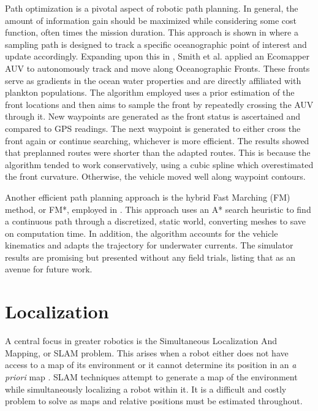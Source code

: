 \documentclass[double,12pt]{beavtex}
\begin{document}
Path optimization is a pivotal aspect of robotic path planning. In general, the amount of information gain should be maximized while considering some cost function, often times the mission duration. This approach is shown in \cite{smithtracking} where a sampling path is designed to track a specific oceanographic point of interest and update accordingly. Expanding upon this in \cite{smithfront}, Smith et al. applied an Ecomapper AUV to autonomously track and move along Oceanographic Fronts. These fronts serve as gradients in the ocean water properties and are directly affiliated with plankton populations. The algorithm employed uses a prior estimation of the front locations and then aims to sample the front by repeatedly crossing the AUV through it. New waypoints are generated as the front status is ascertained and compared to GPS readings. The next waypoint is generated to either cross the front again or continue searching, whichever is more efficient. The results showed that preplanned routes were shorter than the adapted routes. This is because the algorithm tended to work conservatively, using a cubic spline which overestimated the front curvature. Otherwise, the vehicle moved well along waypoint contours.

Another efficient path planning approach is the hybrid Fast Marching (FM) method, or FM*, employed in \cite{petres}. This approach uses an A* search heuristic to find a continuous path through a discretized, static world, converting meshes to save on computation time. In addition, the algorithm accounts for the vehicle kinematics and adapts the trajectory for underwater currents. The simulator results are promising but presented without any field trials, listing that as an avenue for future work. 

\section{Localization}
A central focus in greater robotics is the Simultaneous Localization And Mapping, or SLAM problem. This arises when a robot either does not have access to a map of its environment or it cannot determine its position in an \textit{a priori} map \cite{prob}. SLAM techniques attempt to generate a map of the environment while simultaneously localizing a robot within it. It is a difficult and costly problem to solve as maps and relative positions must be estimated throughout. 
\end{document}
